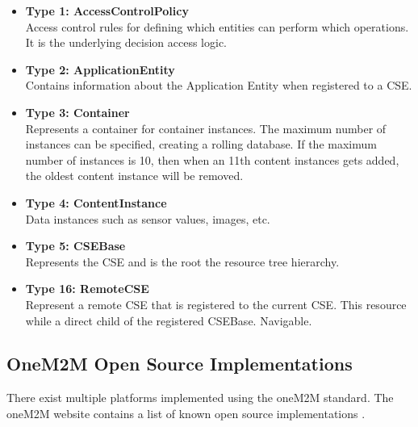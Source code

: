 \begin{itemize}
  \item \textbf{Type 1: AccessControlPolicy}\\ Access control rules for defining which entities can perform which operations. It is the underlying decision access logic.
  \item \textbf{Type 2: ApplicationEntity}\\Contains information about the Application Entity when registered to a CSE. 
  \item \textbf{Type 3: Container}\\Represents a container for container instances. The maximum number of instances can be specified, creating a rolling database. If the maximum number of instances is 10, then when an 11th content instances gets added, the oldest content instance will be removed. 
  \item \textbf{Type 4: ContentInstance}\\Data instances such as sensor values, images, etc.
  \item \textbf{Type 5: CSEBase}\\Represents the CSE and is the root the resource tree hierarchy.
  \item \textbf{Type 16: RemoteCSE}\\Represent a  remote CSE that is registered to the current CSE. This resource while a direct child of the registered CSEBase. Navigable. 
\end{itemize}   

\subsection{OneM2M Open Source Implementations}

There exist multiple platforms implemented using the oneM2M standard. The oneM2M website contains a list of known open source implementations \cite{oneM2M.org2017OneM2MProjects}.

